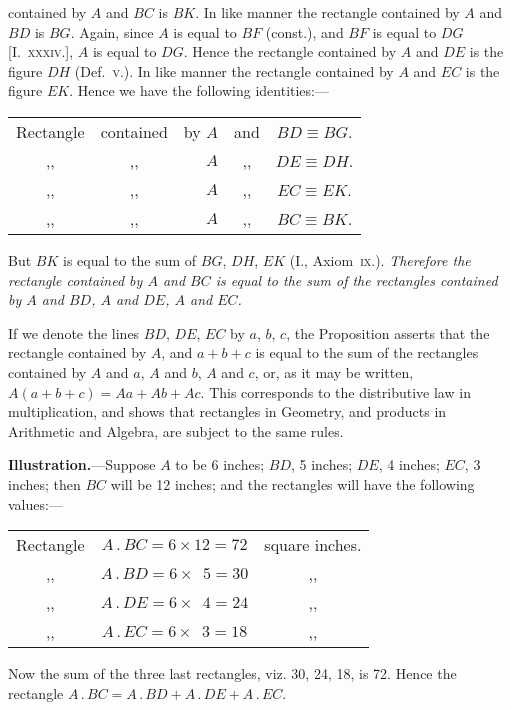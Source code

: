 \documentclass[oneside]{book}
\begin{document}
contained by $A$ and $BC$ is $BK$. In like manner the
rectangle contained by $A$ and $BD$ is $BG$. Again, since
$A$ is equal to $BF$ (const.), and $BF$ is equal to $DG$
[I.~\textsc{xxxiv}.], $A$ is equal to $DG$. Hence the rectangle
contained by $A$ and $DE$ is the figure $DH$ (Def.~\textsc{v}.). In
like manner the rectangle contained by $A$ and $EC$ is
the figure $EK$. Hence we have the following identities:---
\begin{center}
\begin{tabular}{c@{\ }c@{\ }r@{\ }c@{\ }c}
Rectangle & contained & by $A$ & and & $BD \equiv BG$.  \\
    ,,    &     ,,    &    $A$ & ,,  & $DE \equiv DH$.  \\
    ,,    &     ,,    &    $A$ & ,,  & $EC \equiv EK$.  \\
    ,,    &     ,,    &    $A$ & ,,  & $BC \equiv BK$.
\end{tabular}
\end{center}

But $BK$ is equal to the sum of $BG$, $DH$, $EK$
(I., Axiom~\textsc{ix}.). \emph{Therefore the rectangle contained by $A$
and $BC$ is equal to the sum of the rectangles contained by
$A$ and $BD$, $A$ and $DE$, $A$ and $EC$.}\par\medskip

\begin{footnotesize}
If we denote the lines $BD$, $DE$, $EC$ by $a$, $b$, $c$, the Proposition
asserts that the rectangle contained by $A$, and $a+b+c$ is equal to
the sum of the rectangles contained by $A$ and $a$, $A$ and $b$, $A$ and $c$,
or, as it may be written, $A (a+b+c) = Aa + Ab + Ac$. This corresponds
to the distributive law in multiplication, and shows that
rectangles in Geometry, and products in Arithmetic and Algebra,
are subject to the same rules.\par\medskip

\textbf{Illustration.}---Suppose $A$ to be 6 inches; $BD$, 5 inches;
$DE$, 4 inches; $EC$, 3 inches; then $BC$ will be 12 inches; and
the rectangles will have the following values:---
\begin{center}
\begin{tabular}{c@{\ }c@{\ }c}
Rectangle & $A\,.\,BC = 6\times 12 = 72$ & square inches.  \\
    ,,    & $A\,.\,BD = 6\times \phantom{1}5 = 30$ &  ,,   \\
    ,,    & $A\,.\,DE = 6\times \phantom{1}4 = 24$ &  ,,   \\
    ,,    & $A\,.\,EC = 6\times \phantom{1}3 = 18$ &  ,,
\end{tabular}
\end{center}

Now the sum of the three last rectangles, viz. 30, 24, 18, is 72.
Hence the rectangle $A\,.\,BC = A\,.\,BD + A\,.\,DE + A\,.\,EC$.
\par\end{footnotesize}\medskip
\end{document}

